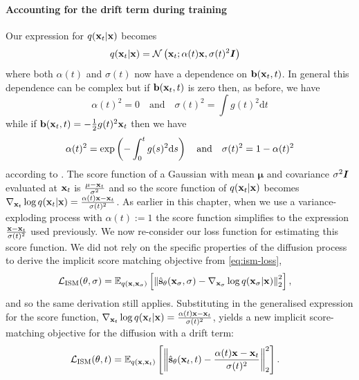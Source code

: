 \paragraph{Accounting for the drift term during training}
Our expression for $q({\mathbf{x}}_t|{\mathbf{x}})$ becomes
\begin{align} \label{eq:vp-diffusion-q-noising}
    q({\mathbf{x}}_t|{\mathbf{x}}) &= {\mathcal{N}} \left( {\mathbf{x}}_t; \alpha(t){\mathbf{x}}, \sigma(t)^2{\bm{I}} \right)
\end{align}
where both $\alpha(t)$ and $\sigma(t)$ now have a dependence on ${\mathbf{b}}({\mathbf{x}}_t, t)$. In general this dependence can be complex but if ${\mathbf{b}}({\mathbf{x}}_t, t)$ is zero then, as before, we have 
\begin{equation}
\alpha(t)^2 = 0 \quad\text{and}\quad \sigma(t)^2 = \int g(t)^2 \mathrm{d}t
\end{equation}
while if ${\mathbf{b}}({\mathbf{x}}_t, t) = - \frac{1}{2}g(t)^2{\mathbf{x}}_t$ then we have 
\begin{equation}
    \alpha(t)^2 = \text{exp}\left( - \int_0^t g(s)^2 \mathrm{d} s \right) \quad\text{and}\quad \sigma(t)^2 = 1 - \alpha(t)^2
\end{equation}
according to \citet{song2020score}. The score function of a Gaussian with mean $\mathbf{\mu}$ and covariance $\sigma^2{\bm{I}}$ evaluated at ${\mathbf{x}}_t$ is $\frac{\mathbf{\mu} - {\mathbf{x}}_t}{\sigma^2}$ and so the score function of $q({\mathbf{x}}_t|{\mathbf{x}})$ becomes $\nabla_{{\mathbf{x}}_t} \log q({\mathbf{x}}_t|{\mathbf{x}}) = \frac{\alpha(t){\mathbf{x}} - {\mathbf{x}}_t}{\sigma(t)^2}$. As earlier in this chapter, when we use a variance-exploding process with $\alpha(t) := 1$ the score function simplifies to the expression $\frac{{\mathbf{x}}-{\mathbf{x}}_t}{\sigma(t)^2}$ used previously. We now re-consider our loss function for estimating this score function. We did not rely on the specific properties of the diffusion process to derive the implicit score matching objective from \cref{eq:ism-loss},
\begin{align} \label{eq:ism-loss-with-drift}
    \mathcal{L}_\text{ISM}(\theta, \sigma) &= \mathbb{E}_{q({\mathbf{x}}, {\mathbf{x}}_\sigma)} \left[ 
    \left\| \hat{{\mathbf{s}}}_\theta({\mathbf{x}}_\sigma, \sigma) - \nabla_{{\mathbf{x}}_\sigma} \log q({\mathbf{x}}_\sigma|{\mathbf{x}}) \right\|_2^2 \right],
\end{align}
and so the same derivation still applies. Substituting in the generalised expression for the score function, $\nabla_{{\mathbf{x}}_t} \log q({\mathbf{x}}_t|{\mathbf{x}}) = \frac{\alpha(t){\mathbf{x}} - {\mathbf{x}}_t}{\sigma(t)^2}$, yields a new implicit score-matching objective for the diffusion with a drift term:
\begin{align}
    \mathcal{L}_\text{ISM}(\theta, t) &= \mathbb{E}_{q({\mathbf{x}}, {\mathbf{x}}_t)} \left[ \left\| \hat{{\mathbf{s}}}_\theta({\mathbf{x}}_t, t) - \frac{\alpha(t){\mathbf{x}} - {\mathbf{x}}_t}{\sigma(t)^2} \right\|_2^2 \right].
\end{align}
